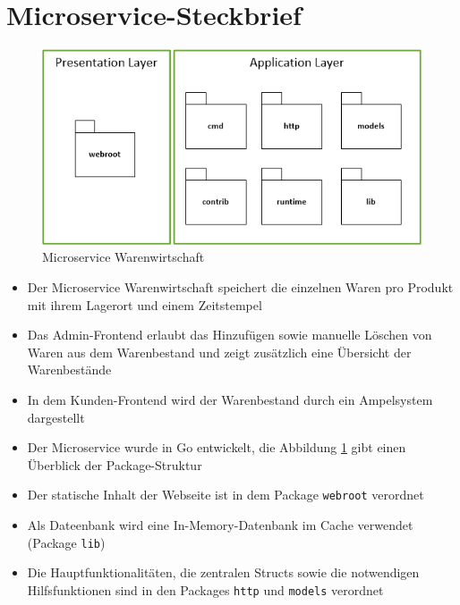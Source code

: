 \section{Microservice-Steckbrief}
\label{sec: Microservice-Steckbrief}

\begin{figure}[H]
	\begin{center}
	\includegraphics[width=0.65 \textwidth]{./Bilder/struktur.png}
	\end{center}
	\caption{Microservice Warenwirtschaft}
	\label{pic: Microservice Warenwirtschaft}
\end{figure}


\begin{itemize}
	\item Der Microservice Warenwirtschaft speichert die einzelnen Waren pro Produkt mit ihrem Lagerort und einem Zeitstempel
	\item Das Admin-Frontend erlaubt das Hinzufügen sowie manuelle Löschen von Waren aus dem Warenbestand und zeigt zusätzlich eine Übersicht der Warenbestände
	\item In dem Kunden-Frontend wird der Warenbestand durch ein Ampelsystem dargestellt
	\item Der Microservice wurde in Go entwickelt, die Abbildung \ref{pic: Microservice Warenwirtschaft} gibt einen Überblick der Package-Struktur
	\item Der statische Inhalt der Webseite ist in dem Package \texttt{webroot} verordnet
	\item Als Dateenbank wird eine In-Memory-Datenbank im Cache verwendet (Package \texttt{lib})
	\item Die Hauptfunktionalitäten, die zentralen Structs sowie die notwendigen Hilfsfunktionen sind in den Packages \texttt{http} und \texttt{models} verordnet
\end{itemize}
